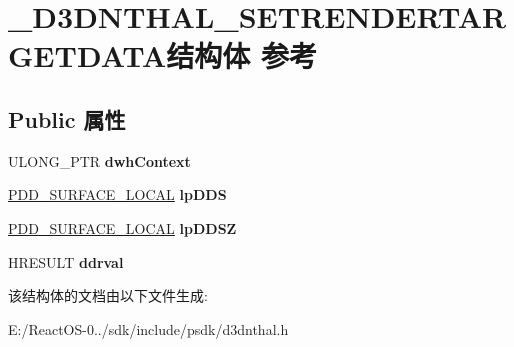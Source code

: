 \hypertarget{struct___d3_d_n_t_h_a_l___s_e_t_r_e_n_d_e_r_t_a_r_g_e_t_d_a_t_a}{}\section{\+\_\+\+D3\+D\+N\+T\+H\+A\+L\+\_\+\+S\+E\+T\+R\+E\+N\+D\+E\+R\+T\+A\+R\+G\+E\+T\+D\+A\+T\+A结构体 参考}
\label{struct___d3_d_n_t_h_a_l___s_e_t_r_e_n_d_e_r_t_a_r_g_e_t_d_a_t_a}
\subsection*{Public 属性}
\begin{DoxyCompactItemize}
\item 
\mbox{\label{struct___d3_d_n_t_h_a_l___s_e_t_r_e_n_d_e_r_t_a_r_g_e_t_d_a_t_a_a903cefd109fd5a91a66843f39d4664bd}} 
U\+L\+O\+N\+G\+\_\+\+P\+TR {\bfseries dwh\+Context}
\item 
\mbox{\label{struct___d3_d_n_t_h_a_l___s_e_t_r_e_n_d_e_r_t_a_r_g_e_t_d_a_t_a_ab0210ec4f93b579a95462064ec936ba4}} 
\hyperlink{struct___d_d___s_u_r_f_a_c_e___l_o_c_a_l}{P\+D\+D\+\_\+\+S\+U\+R\+F\+A\+C\+E\+\_\+\+L\+O\+C\+AL} {\bfseries lp\+D\+DS}
\item 
\mbox{\label{struct___d3_d_n_t_h_a_l___s_e_t_r_e_n_d_e_r_t_a_r_g_e_t_d_a_t_a_aa57aaaa04ba7336f5a395719232ea47f}} 
\hyperlink{struct___d_d___s_u_r_f_a_c_e___l_o_c_a_l}{P\+D\+D\+\_\+\+S\+U\+R\+F\+A\+C\+E\+\_\+\+L\+O\+C\+AL} {\bfseries lp\+D\+D\+SZ}
\item 
\mbox{\label{struct___d3_d_n_t_h_a_l___s_e_t_r_e_n_d_e_r_t_a_r_g_e_t_d_a_t_a_a54a940648e6da1f2be80bb0a04cb7f45}} 
H\+R\+E\+S\+U\+LT {\bfseries ddrval}
\end{DoxyCompactItemize}


该结构体的文档由以下文件生成\+:\begin{DoxyCompactItemize}
\item 
E\+:/\+React\+O\+S-\/0../sdk/include/psdk/d3dnthal.\+h\end{DoxyCompactItemize}
